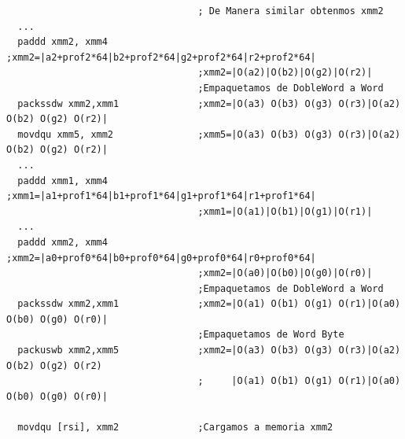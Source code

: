 \begin{codesnippet}
\begin{verbatim}    
                                  ; De Manera similar obtenmos xmm2
  ...
  paddd xmm2, xmm4                ;xmm2=|a2+prof2*64|b2+prof2*64|g2+prof2*64|r2+prof2*64|
                                  ;xmm2=|O(a2)|O(b2)|O(g2)|O(r2)|	
                                  ;Empaquetamos de DobleWord a Word	
  packssdw xmm2,xmm1              ;xmm2=|O(a3) O(b3) O(g3) O(r3)|O(a2) O(b2) O(g2) O(r2)|
  movdqu xmm5, xmm2               ;xmm5=|O(a3) O(b3) O(g3) O(r3)|O(a2) O(b2) O(g2) O(r2)|
  ...
  paddd xmm1, xmm4                ;xmm1=|a1+prof1*64|b1+prof1*64|g1+prof1*64|r1+prof1*64|
                                  ;xmm1=|O(a1)|O(b1)|O(g1)|O(r1)|						
  ...
  paddd xmm2, xmm4                ;xmm2=|a0+prof0*64|b0+prof0*64|g0+prof0*64|r0+prof0*64|
                                  ;xmm2=|O(a0)|O(b0)|O(g0)|O(r0)|                   
                                  ;Empaquetamos de DobleWord a Word
  packssdw xmm2,xmm1              ;xmm2=|O(a1) O(b1) O(g1) O(r1)|O(a0) O(b0) O(g0) O(r0)|						
                                  ;Empaquetamos de Word Byte
  packuswb xmm2,xmm5              ;xmm2=|O(a3) O(b3) O(g3) O(r3)|O(a2) O(b2) O(g2) O(r2)
                                  ;     |O(a1) O(b1) O(g1) O(r1)|O(a0) O(b0) O(g0) O(r0)|                      

  movdqu [rsi], xmm2              ;Cargamos a memoria xmm2                        			
\end{verbatim}
\end{codesnippet}